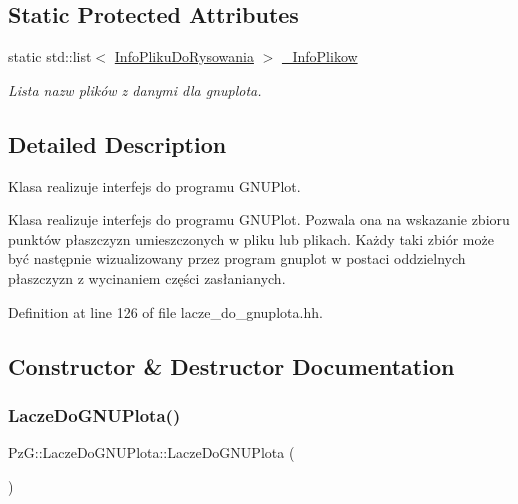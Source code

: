 \subsection*{Static Protected Attributes}
\begin{DoxyCompactItemize}
\item 
static std\+::list$<$ \hyperlink{class_pz_g_1_1_info_pliku_do_rysowania}{Info\+Pliku\+Do\+Rysowania} $>$ \hyperlink{class_pz_g_1_1_lacze_do_g_n_u_plota_a1916c5a6fecfb3554e9d5204b2f2086c}{\+\_\+\+Info\+Plikow}
\begin{DoxyCompactList}\small\item\em Lista nazw plików z danymi dla {\itshape gnuplota}. \end{DoxyCompactList}\end{DoxyCompactItemize}


\subsection{Detailed Description}
Klasa realizuje interfejs do programu G\+N\+U\+Plot. 

Klasa realizuje interfejs do programu G\+N\+U\+Plot. Pozwala ona na wskazanie zbioru punktów płaszczyzn umieszczonych w pliku lub plikach. Każdy taki zbiór może być następnie wizualizowany przez program gnuplot w postaci oddzielnych płaszczyzn z wycinaniem części zasłanianych. 

Definition at line 126 of file lacze\+\_\+do\+\_\+gnuplota.\+hh.



\subsection{Constructor \& Destructor Documentation}
\mbox{\label{class_pz_g_1_1_lacze_do_g_n_u_plota_a5845189b5ab8c3634acf57024e5deeaf}} 
\subsubsection{\texorpdfstring{Lacze\+Do\+G\+N\+U\+Plota()}{LaczeDoGNUPlota()}}
{\footnotesize\ttfamily Pz\+G\+::\+Lacze\+Do\+G\+N\+U\+Plota\+::\+Lacze\+Do\+G\+N\+U\+Plota (\begin{DoxyParamCaption}{ }\end{DoxyParamCaption})}



